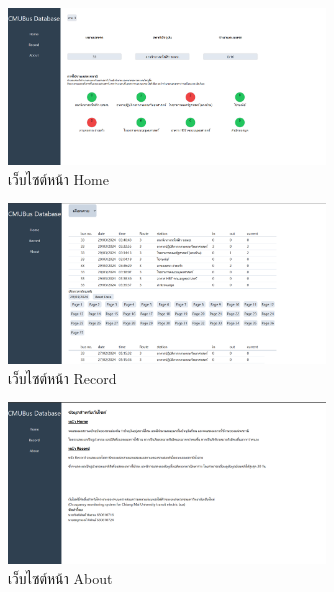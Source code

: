   \begin{figure}[h!]
    \begin{center}
      \includegraphics[width=0.75\textwidth]{home.png}
    \end{center}
    \caption{เว็บไซต์หน้า Home}
    \label{fig:home}
  \end{figure}

  \begin{figure}[h!]
    \begin{center}
      \includegraphics[width=0.75\textwidth]{record.png}
    \end{center}
    \caption{เว็บไซต์หน้า Record}
    \label{fig:record}
  \end{figure}

  \begin{figure}[h!]
    \begin{center}
      \includegraphics[width=0.75\textwidth]{about.png}
    \end{center}
    \caption{เว็บไซต์หน้า About}
    \label{fig:about}
  \end{figure}